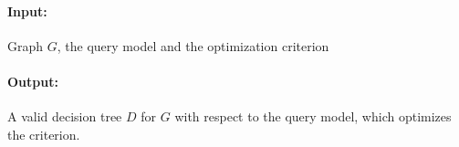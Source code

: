 \begin{tcolorbox}[colback=white, title=Generalized Search Problem, fonttitle=\bfseries, breakable]
\paragraph{Input:} Graph $G$, the query model and the optimization criterion
\paragraph{Output:} A valid decision tree $D$ for $G$ with respect to the query model, which optimizes the criterion.


\end{tcolorbox}